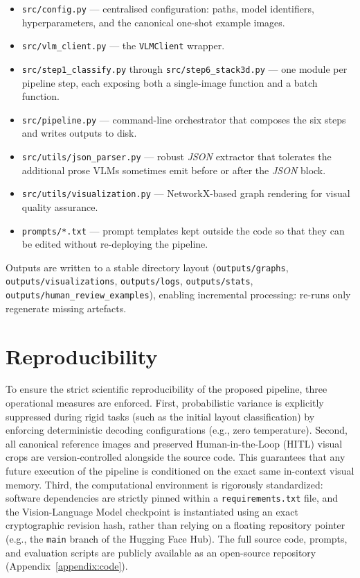 \documentclass[12pt,a4paper,openright]{report}
\newcommand{\code}[1]{\texttt{#1}}
\begin{document}
\begin{itemize}
    \item \code{src/config.py} --- centralised configuration: paths, model identifiers, hyperparameters, and the canonical one-shot example images.
    \item \code{src/vlm\_client.py} --- the \code{VLMClient} wrapper.
    \item \code{src/step1\_classify.py} through \code{src/step6\_stack3d.py} --- one module per pipeline step, each exposing both a single-image function and a batch function.
    \item \code{src/pipeline.py} --- command-line orchestrator that composes the six steps and writes outputs to disk.
    \item \code{src/utils/json\_parser.py} --- robust \textit{JSON} extractor that tolerates the additional prose VLMs sometimes emit before or after the \textit{JSON} block.
    \item \code{src/utils/visualization.py} --- NetworkX-based graph rendering for visual quality assurance.
    \item \code{prompts/*.txt} --- prompt templates kept outside the code so that they can be edited without re-deploying the pipeline.
\end{itemize}

Outputs are written to a stable directory layout (\code{outputs/graphs}, \code{outputs/visualizations}, \code{outputs/logs}, \code{outputs/stats}, \code{outputs/human\_review\_examples}), enabling incremental processing: re-runs only regenerate missing artefacts.

\section{Reproducibility}
\label{sec:reproducibility}

To ensure the strict scientific reproducibility of the proposed pipeline, three operational measures are enforced. First, probabilistic variance is explicitly suppressed during rigid tasks (such as the initial layout classification) by enforcing deterministic decoding configurations (e.g., zero temperature). Second, all canonical reference images and preserved Human-in-the-Loop (HITL) visual crops are version-controlled alongside the source code. This guarantees that any future execution of the pipeline is conditioned on the exact same in-context visual memory. Third, the computational environment is rigorously standardized: software dependencies are strictly pinned within a \texttt{requirements.txt} file, and the Vision-Language Model checkpoint is instantiated using an exact cryptographic revision hash, rather than relying on a floating repository pointer (e.g., the \texttt{main} branch of the Hugging Face Hub). The full source code, prompts, and evaluation scripts are publicly available as an open-source repository (Appendix~\ref{appendix:code}).
\end{document}
